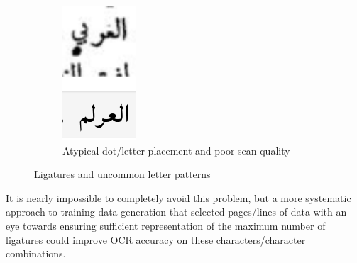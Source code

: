 \begin{figure}[!ht]
\begin{subfigure}[b]{0.3\linewidth}
	\centering
	\includegraphics[width=\linewidth]{images/image25.png}
	\caption{Atypical dot/letter placement and poor scan quality}
	\label{fig3:fig14}
	\end{subfigure}
	\caption{Ligatures and uncommon letter patterns}
	\label{fig3:fig914}
\end{figure}

It is nearly impossible to completely avoid this problem, but a more systematic
approach to training data generation that selected pages/lines of data with an
eye towards ensuring sufficient representation of the maximum number of
ligatures could improve OCR accuracy on these characters/character
combinations.

